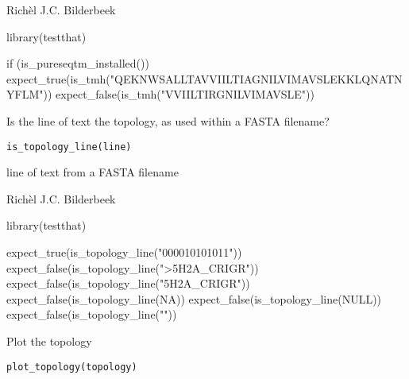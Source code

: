 \documentclass[letterpaper]{book}
\begin{document}
%
\begin{Author}\relax
Richèl J.C. Bilderbeek
\end{Author}
%
\begin{Examples}
\begin{ExampleCode}
library(testthat)

if (is_pureseqtm_installed()) {
  expect_true(is_tmh("QEKNWSALLTAVVIILTIAGNILVIMAVSLEKKLQNATNYFLM"))
  expect_false(is_tmh("VVIILTIRGNILVIMAVSLE"))
}
\end{ExampleCode}
\end{Examples}
%
\begin{Description}\relax
Is the line of text the topology, as used within
a FASTA filename?
\end{Description}
%
\begin{Usage}
\begin{verbatim}
is_topology_line(line)
\end{verbatim}
\end{Usage}
%
\begin{Arguments}
\begin{ldescription}
\item[\code{line}] line of text from a FASTA filename
\end{ldescription}
\end{Arguments}
%
\begin{Author}\relax
Richèl J.C. Bilderbeek
\end{Author}
%
\begin{Examples}
\begin{ExampleCode}
library(testthat)

expect_true(is_topology_line("000010101011"))
expect_false(is_topology_line(">5H2A_CRIGR"))
expect_false(is_topology_line("5H2A_CRIGR"))
expect_false(is_topology_line(NA))
expect_false(is_topology_line(NULL))
expect_false(is_topology_line(""))
\end{ExampleCode}
\end{Examples}
%
\begin{Description}\relax
Plot the topology
\end{Description}
%
\begin{Usage}
\begin{verbatim}
plot_topology(topology)
\end{verbatim}
\end{Usage}
\end{document}
